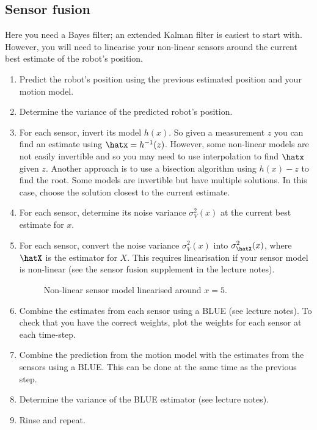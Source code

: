 \documentclass[a4paper, 12pt]{article}
\newcommand{\est}[1]{\expandafter\hat#1}
\newcommand{\var}[1]{\sigma_{#1}^2}
\begin{document}
\subsection{Sensor fusion}


Here you need a Bayes filter; an extended Kalman filter is easiest to
start with.  However, you will need to linearise your non-linear
sensors around the current best estimate of the robot's position.

\begin{enumerate}
\item Predict the robot's position using the previous estimated
  position and your motion model.

\item Determine the variance of the predicted robot's position.

\item For each sensor, invert its model $h(x)$.  So given a
  measurement $z$ you can find an estimate using $\est{x} =
  h^{-1}(z)$.  However, some non-linear models are not easily
  invertible and so you may need to use interpolation to find
  $\est{x}$ given $z$.  Another approach is to use a bisection
  algorithm using $h(x) - z$ to find the root.  Some models are
  invertible but have multiple solutions.  In this case, choose the
  solution closest to the current estimate.

\item For each sensor, determine its noise variance $\var{V}(x)$ at
  the current best estimate for $x$.

\item For each sensor, convert the noise variance $\var{V}(x)$ into
  $\var{\est{X}}(x)$, where $\est{X}$ is the estimator for $X$.  This
  requires linearisation if your sensor model is non-linear (see the
  sensor fusion supplement in the lecture notes).

  \begin{figure}[!h]
  \centering
  
  \caption{Non-linear sensor model linearised around $x=5$.}
  \label{fig:linearised}
  \end{figure}

\item Combine the estimates from each sensor using a BLUE (see lecture
  notes).  To check that you have the correct weights, plot the
  weights for each sensor at each time-step.

\item Combine the prediction from the motion model with the estimates
  from the sensors using a BLUE.  This can be done at the same time as
  the previous step.

\item Determine the variance of the BLUE estimator (see lecture
  notes).

\item Rinse and repeat.
\end{enumerate}
\end{document}
